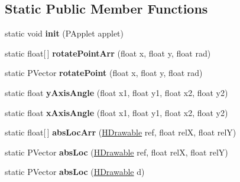\subsection*{Static Public Member Functions}
\begin{DoxyCompactItemize}
\item 
\hypertarget{classhype_1_1util_1_1_h_math_a10a2fda33ced69b93f0ac7045cffd734}{static void {\bfseries init} (P\-Applet applet)}\label{classhype_1_1util_1_1_h_math_a10a2fda33ced69b93f0ac7045cffd734}

\item 
\hypertarget{classhype_1_1util_1_1_h_math_ae8023e98d4523ae08d796cf9f62191f2}{static float\mbox{[}$\,$\mbox{]} {\bfseries rotate\-Point\-Arr} (float x, float y, float rad)}\label{classhype_1_1util_1_1_h_math_ae8023e98d4523ae08d796cf9f62191f2}

\item 
\hypertarget{classhype_1_1util_1_1_h_math_aa4e1bf088df604f61f7bf8a621cb8e99}{static P\-Vector {\bfseries rotate\-Point} (float x, float y, float rad)}\label{classhype_1_1util_1_1_h_math_aa4e1bf088df604f61f7bf8a621cb8e99}

\item 
\hypertarget{classhype_1_1util_1_1_h_math_a363476101dfefce8fb96f4de6a19ec16}{static float {\bfseries y\-Axis\-Angle} (float x1, float y1, float x2, float y2)}\label{classhype_1_1util_1_1_h_math_a363476101dfefce8fb96f4de6a19ec16}

\item 
\hypertarget{classhype_1_1util_1_1_h_math_a89e891d8dfbd6e884a753405a8b13d26}{static float {\bfseries x\-Axis\-Angle} (float x1, float y1, float x2, float y2)}\label{classhype_1_1util_1_1_h_math_a89e891d8dfbd6e884a753405a8b13d26}

\item 
\hypertarget{classhype_1_1util_1_1_h_math_a7d6bd8eafa0274325c68b60472b0999c}{static float\mbox{[}$\,$\mbox{]} {\bfseries abs\-Loc\-Arr} (\hyperlink{classhype_1_1drawable_1_1_h_drawable}{H\-Drawable} ref, float rel\-X, float rel\-Y)}\label{classhype_1_1util_1_1_h_math_a7d6bd8eafa0274325c68b60472b0999c}

\item 
\hypertarget{classhype_1_1util_1_1_h_math_a572a4aa9b5038abed726c0e6676f3405}{static P\-Vector {\bfseries abs\-Loc} (\hyperlink{classhype_1_1drawable_1_1_h_drawable}{H\-Drawable} ref, float rel\-X, float rel\-Y)}\label{classhype_1_1util_1_1_h_math_a572a4aa9b5038abed726c0e6676f3405}

\item 
\hypertarget{classhype_1_1util_1_1_h_math_aee57098084f0f50e331137118f8117de}{static P\-Vector {\bfseries abs\-Loc} (\hyperlink{classhype_1_1drawable_1_1_h_drawable}{H\-Drawable} d)}\label{classhype_1_1util_1_1_h_math_aee57098084f0f50e331137118f8117de}


\end{DoxyCompactItemize}
